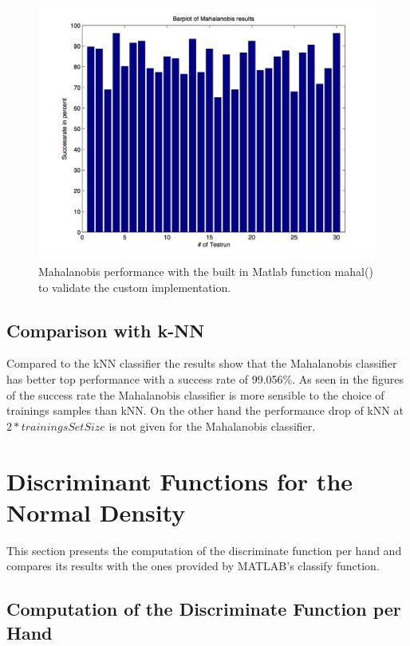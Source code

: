 \documentclass[subfigure,epsfig,fleqn,amssmb,float,caption,ausarbeitung]{scrartcl}
\begin{document}
\begin{figure}
	\centering
	\includegraphics[scale=0.75]{img/mahalanobis_results_matlab_covmat.jpg}
	\caption{Mahalanobis performance with the built in Matlab function mahal() to validate the custom implementation.}
	\label{mahal4}
\end{figure}

\subsection{Comparison with k-NN}
\label{sec:MahalanobisComparison}

Compared to the kNN classifier the results show that the Mahalanobis classifier has better top performance with a success rate of 99.056\%. As seen in the figures of the success rate the Mahalanobis classifier is more sensible to the choice of trainings samples than kNN. On the other hand the performance drop of kNN at $2*trainingsSetSize$ is not given for the Mahalanobis classifier. 


\section{Discriminant Functions for the Normal Density}
\label{sec:DiscriminantFunctions}

This section presents the computation of the discriminate function per hand and compares its results with the ones provided by MATLAB's classify function.


\subsection{Computation of the Discriminate Function per Hand}
\label{sec:Hand}
\end{document}
